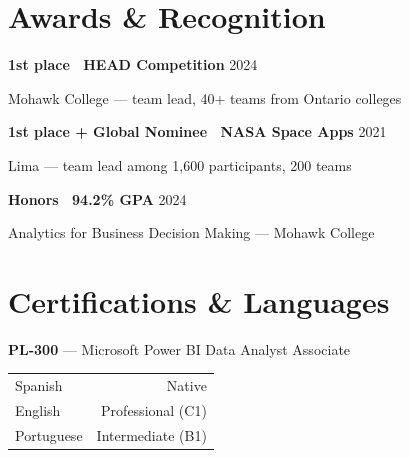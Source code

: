 \documentclass[10pt,letterpaper]{article}
\begin{document}
\vspace{4pt}
\begin{minipage}[t]{0.48\linewidth}
  \section*{Awards \& Recognition}
  \textbf{1st place \textperiodcentered\ HEAD Competition} \hfill \textcolor{inkmute}{\small 2024}\par
  \textcolor{inkdim}{\footnotesize Mohawk College --- team lead, 40+ teams from Ontario colleges}\par
  \vspace{4pt}
  \textbf{1st place + Global Nominee \textperiodcentered\ NASA Space Apps} \hfill \textcolor{inkmute}{\small 2021}\par
  \textcolor{inkdim}{\footnotesize Lima --- team lead among 1{,}600 participants, 200 teams}\par
  \vspace{4pt}
  \textbf{Honors \textperiodcentered\ 94.2\% GPA} \hfill \textcolor{inkmute}{\small 2024}\par
  \textcolor{inkdim}{\footnotesize Analytics for Business Decision Making --- Mohawk College}
\end{minipage}\hfill
\begin{minipage}[t]{0.48\linewidth}
  \section*{Certifications \& Languages}
  \textbf{PL-300} \textcolor{inkmute}{\footnotesize --- Microsoft Power BI Data Analyst Associate}\par
  \vspace{6pt}
  \begin{tabularx}{\linewidth}{@{}X r@{}}
    Spanish     & \textcolor{inkmute}{\small Native} \\
    English     & \textcolor{inkmute}{\small Professional (C1)} \\
    Portuguese  & \textcolor{inkmute}{\small Intermediate (B1)} \\
  \end{tabularx}
\end{minipage}

\vspace{18pt}
\end{document}
